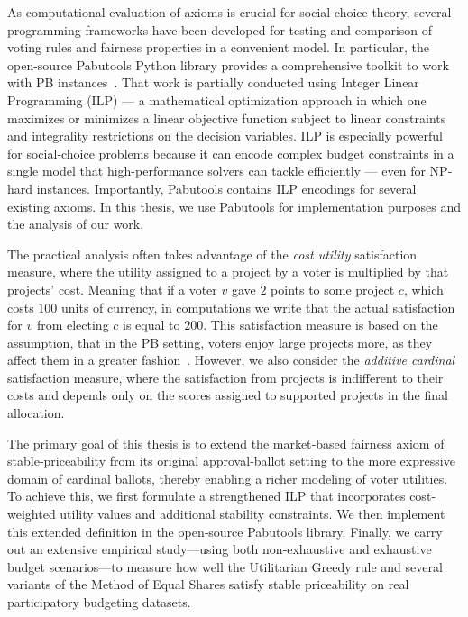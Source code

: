 As computational evaluation of axioms is crucial for social choice theory, several programming frameworks have been developed for testing and comparison of voting rules and fairness properties in a convenient model. In particular, the open-source Pabutools Python library provides a comprehensive toolkit to work with PB instances~\cite{Pabutools}. That work is partially conducted using Integer Linear Programming (ILP) --- a mathematical optimization approach in which one maximizes or minimizes a linear objective function subject to linear constraints and integrality restrictions on the decision variables. ILP is especially powerful for social‐choice problems because it can encode complex budget constraints in a single model that high-performance solvers can tackle efficiently — even for NP‐hard instances. Importantly, Pabutools contains ILP encodings for several existing axioms. In this thesis, we use Pabutools for implementation purposes and the analysis of our work. 

The practical analysis often takes advantage of the \emph{cost utility} satisfaction measure, where the utility assigned to a project by a voter is multiplied by that projects' cost. Meaning that if a voter $v$ gave $2$ points to some project $c$, which costs $100$ units of currency, in computations we write that the actual satisfaction for $v$ from electing $c$ is equal to $200$. This satisfaction measure is based on the assumption, that in the PB setting, voters enjoy large projects more, as they affect them in a greater fashion~\cite{BrillForster2023}. However, we also consider the \emph{additive cardinal} satisfaction measure, where the satisfaction from projects is indifferent to their costs and depends only on the scores assigned to supported projects in the final allocation.

The primary goal of this thesis is to extend the market‐based fairness axiom of stable‐priceability from its original approval‐ballot setting to the more expressive domain of cardinal ballots, thereby enabling a richer modeling of voter utilities. To achieve this, we first formulate a strengthened ILP that incorporates cost‐weighted utility values and additional stability constraints. We then implement this extended definition in the open‐source Pabutools library. Finally, we carry out an extensive empirical study—using both non‐exhaustive and exhaustive budget scenarios—to measure how well the Utilitarian Greedy rule and several variants of the Method of Equal Shares satisfy stable priceability on real participatory budgeting datasets.

